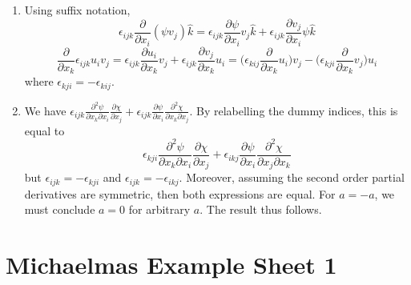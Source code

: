 \documentclass[a4paper]{article}
\begin{document}
\begin{ans}\leavevmode
\begin{enumerate}[label=(\alph*)]
\item  Using suffix notation,
$$\epsilon_{ijk}\frac{\partial}{\partial x_i}(\psi v_j)\hat{k}=\epsilon_{ijk}\frac{\partial\psi}{\partial x_i}v_j\hat{k}+\epsilon_{ijk}\frac{\partial v_j}{\partial x_i}\psi\hat{k}$$
$$\frac{\partial}{\partial x_k}\epsilon_{ijk}u_iv_j=\epsilon_{ijk}\frac{\partial u_i}{\partial x_k}v_j+\epsilon_{ijk}\frac{\partial v_j}{\partial x_k}u_i=\bigg(\epsilon_{kij}\frac{\partial}{\partial x_k}u_i\bigg)v_j-\bigg(\epsilon_{kji}\frac{\partial}{\partial x_k}v_j\bigg)u_i$$
where $\epsilon_{kji}=-\epsilon_{kij}$.
\item We have $\epsilon_{ijk}\frac{\partial^2\psi}{\partial x_k\partial x_i}\frac{\partial\chi}{\partial x_j}+\epsilon_{ijk}\frac{\partial\psi}{\partial x_i}\frac{\partial^2\chi}{\partial x_k\partial x_j}$. By relabelling the dummy indices, this is equal to
$$\epsilon_{kji}\frac{\partial^2\psi}{\partial x_k\partial x_i}\frac{\partial\chi}{\partial x_j}+\epsilon_{ikj}\frac{\partial\psi}{\partial x_i}\frac{\partial^2\chi}{\partial x_j\partial x_k}$$
but $\epsilon_{ijk}=-\epsilon_{kji}$ and $\epsilon_{ijk}=-\epsilon_{ikj}$. Moreover, assuming the second order partial derivatives are symmetric, then both expressions are equal. For $a=-a$, we must conclude $a=0$ for arbitrary $a$. The result thus follows.
\end{enumerate}
\end{ans}
\newpage
\section{Michaelmas Example Sheet 1}
\end{document}
